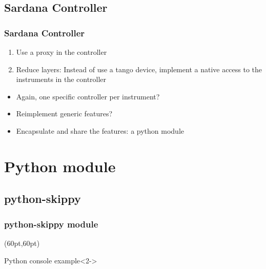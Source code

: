 \documentclass{beamer}
\begin{document}
\subsection{Sardana Controller}

\begin{frame}
  \frametitle{Sardana Controller}
  \begin{enumerate}
    \item<2-> Use a proxy in the controller
    \item<3-> Reduce layers: Instead of use a tango device, implement a native access to the instruments in the controller
  \end{enumerate}
  \begin{itemize}
    \item<4-> \alert{Again}, one specific controller per instrument?
    \item<5-> \alert{Reimplement} generic features?
    \item<6-> {\color{green}Encapsulate and share} the features: a python module
  \end{itemize}
\end{frame}

\section{Python module}

\subsection{python-skippy}

\begin{frame}
  \frametitle{python-skippy module}
  \begin{textblock*}{260pt}(60pt,60pt)
    \begin{exampleblock}{Python console example}<2->
      
    \end{exampleblock}
  \end{textblock*}
\end{frame}
\end{document}
